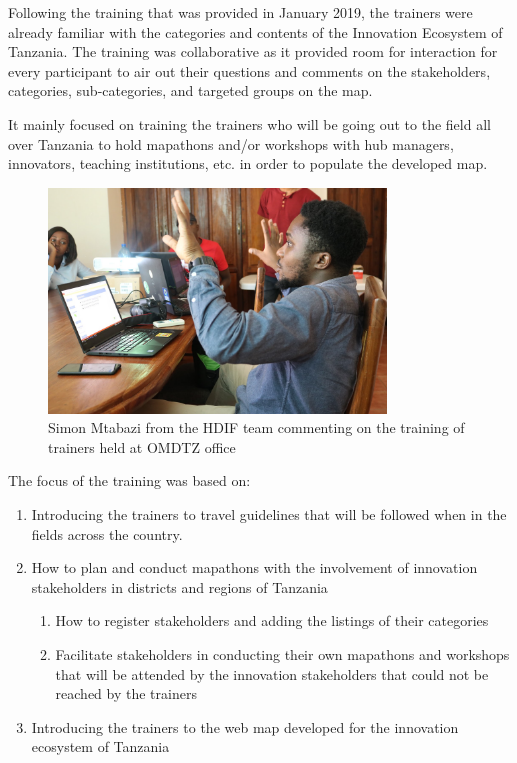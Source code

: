 \documentclass[a4paper,12pt,twoside]{article}
\begin{document}
Following the training that was provided in January 2019, the trainers were already familiar with the categories and contents of the Innovation Ecosystem of Tanzania. The training was collaborative as it provided room for interaction for every participant to air out their questions and comments on the stakeholders, categories, sub-categories, and targeted groups on the map.  

It mainly focused on training the trainers who will be going out to the field all over Tanzania to hold mapathons and/or workshops with hub managers, innovators, teaching institutions, etc. in order to populate the developed map.

\begin{figure}[H] %
	\centering
	\includegraphics[width=0.8\textwidth]{images/Simon_training.JPG}
	\caption{Simon Mtabazi from the HDIF team commenting on the training of trainers held at OMDTZ office}
\end{figure}

The focus of the training was based on:

\begin{enumerate}
	\item Introducing the trainers to travel guidelines that will be followed when in the fields across the country.
	\item How to plan and conduct mapathons with the involvement of innovation stakeholders in districts and regions of Tanzania
	\begin{enumerate}
		\item How to register stakeholders and adding the listings of their categories
		\item Facilitate stakeholders in conducting their own mapathons and workshops that will be attended by the innovation stakeholders that could not be reached by the trainers
	\end{enumerate}
	\item Introducing the trainers to the web map developed for the innovation ecosystem of Tanzania
\end{enumerate}
\end{document}
